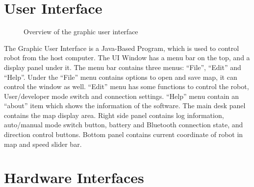 \documentclass[11pt, a4paper]{report}
\begin{document}
\section{User Interface}

\begin{figure}[ht]
\centering
\setlength\fboxsep{2pt}
\setlength\fboxrule{0.2pt}
\caption{Overview of the graphic user interface}
\label{sec:GUI}
\label{fig:GUI}
\end{figure}

The Graphic User Interface is a Java-Based Program, which is used to control robot from the host computer. The UI Window has a menu bar on the top, and a display panel under it.
The menu bar contains three menus: “File”, “Edit” and “Help”. Under the “File” menu contains options to open and save map, it can control the window as well. “Edit” menu has some functions to control the robot, User/developer mode switch and connection settings. “Help” menu contain an “about” item which shows the information of the software.
The main desk panel contains the map display area. Right side panel contains log information, auto/manual mode switch button, battery and Bluetooth connection state, and direction control buttons. Bottom panel contains current coordinate of robot in map and speed slider bar. 

\pagebreak

\section{Hardware Interfaces}
\end{document}
